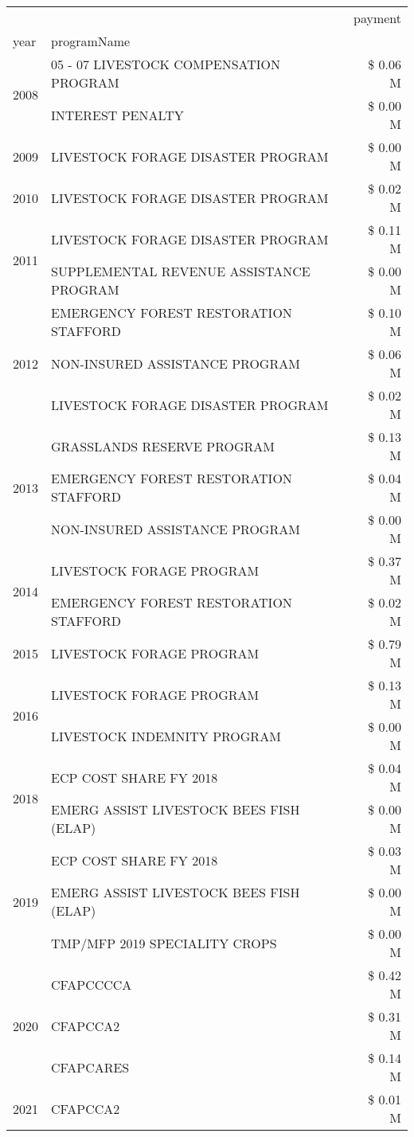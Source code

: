 \begin{tabular}{llr}
\toprule
 &  & payment \\
year & programName &  \\
\midrule
\multirow[t]{2}{*}{2008} & 05 - 07 LIVESTOCK COMPENSATION PROGRAM & \$ 0.06 M \\
 & INTEREST PENALTY & \$ 0.00 M \\
\cline{1-3}
2009 & LIVESTOCK FORAGE DISASTER  PROGRAM & \$ 0.00 M \\
\cline{1-3}
2010 & LIVESTOCK FORAGE DISASTER  PROGRAM & \$ 0.02 M \\
\cline{1-3}
\multirow[t]{2}{*}{2011} & LIVESTOCK FORAGE DISASTER PROGRAM & \$ 0.11 M \\
 & SUPPLEMENTAL REVENUE ASSISTANCE PROGRAM & \$ 0.00 M \\
\cline{1-3}
\multirow[t]{3}{*}{2012} & EMERGENCY FOREST RESTORATION STAFFORD & \$ 0.10 M \\
 & NON-INSURED ASSISTANCE PROGRAM & \$ 0.06 M \\
 & LIVESTOCK FORAGE DISASTER PROGRAM & \$ 0.02 M \\
\cline{1-3}
\multirow[t]{3}{*}{2013} & GRASSLANDS RESERVE PROGRAM & \$ 0.13 M \\
 & EMERGENCY FOREST RESTORATION STAFFORD & \$ 0.04 M \\
 & NON-INSURED ASSISTANCE PROGRAM & \$ 0.00 M \\
\cline{1-3}
\multirow[t]{2}{*}{2014} & LIVESTOCK FORAGE PROGRAM & \$ 0.37 M \\
 & EMERGENCY FOREST RESTORATION STAFFORD & \$ 0.02 M \\
\cline{1-3}
2015 & LIVESTOCK FORAGE PROGRAM & \$ 0.79 M \\
\cline{1-3}
\multirow[t]{2}{*}{2016} & LIVESTOCK FORAGE PROGRAM & \$ 0.13 M \\
 & LIVESTOCK INDEMNITY PROGRAM & \$ 0.00 M \\
\cline{1-3}
\multirow[t]{2}{*}{2018} & ECP COST SHARE FY 2018 & \$ 0.04 M \\
 & EMERG ASSIST LIVESTOCK BEES FISH (ELAP) & \$ 0.00 M \\
\cline{1-3}
\multirow[t]{3}{*}{2019} & ECP COST SHARE FY 2018 & \$ 0.03 M \\
 & EMERG ASSIST LIVESTOCK BEES FISH (ELAP) & \$ 0.00 M \\
 & TMP/MFP 2019 SPECIALITY CROPS & \$ 0.00 M \\
\cline{1-3}
\multirow[t]{3}{*}{2020} & CFAPCCCCA & \$ 0.42 M \\
 & CFAPCCA2 & \$ 0.31 M \\
 & CFAPCARES & \$ 0.14 M \\
\cline{1-3}
2021 & CFAPCCA2 & \$ 0.01 M \\
\cline{1-3}
\bottomrule
\end{tabular}

